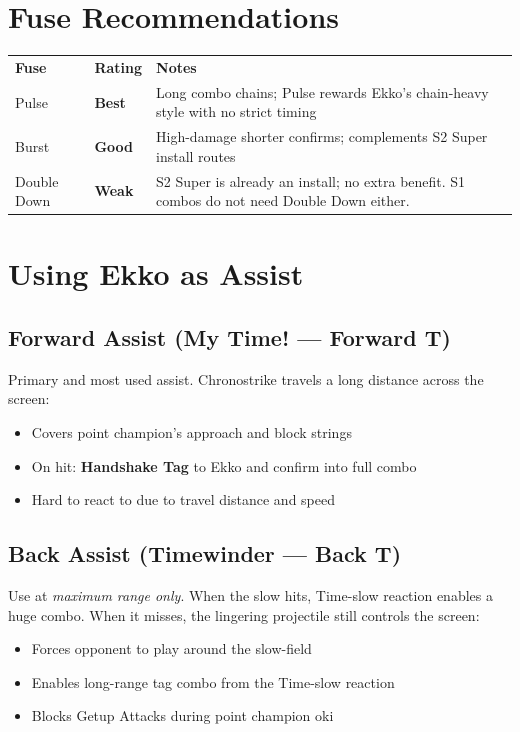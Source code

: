 \documentclass[12pt, a4paper]{report}
\begin{document}
\section{Fuse Recommendations}

\begin{center}
\begin{tabularx}{\linewidth}{C{3cm} C{2cm} L{8.5cm}}
\textcolor{ekkoBlue}{\textbf{Fuse}} & \textcolor{ekkoBlue}{\textbf{Rating}} & \textcolor{ekkoBlue}{\textbf{Notes}} \\
Pulse & \textcolor{ekkoGreen}{\textbf{Best}} & Long combo chains; Pulse rewards Ekko's chain-heavy style with no strict timing \\
Burst & \textcolor{ekkoGold}{\textbf{Good}} & High-damage shorter confirms; complements S2 Super install routes \\
Double Down & \textcolor{ekkoRed}{\textbf{Weak}} & S2 Super is already an install; no extra benefit. S1 combos do not need Double Down either. \\
\end{tabularx}
\end{center}

\section{Using Ekko as Assist}

\subsection{Forward Assist (My Time! --- Forward T)}

Primary and most used assist. Chronostrike travels a long distance across the screen:
\begin{itemize}
  \item Covers point champion's approach and block strings
  \item On hit: \textbf{Handshake Tag} to Ekko and confirm into full combo
  \item Hard to react to due to travel distance and speed
\end{itemize}

\subsection{Back Assist (Timewinder --- Back T)}

Use at \textit{maximum range only}. When the slow hits, Time-slow reaction enables a huge combo. When it misses, the lingering projectile still controls the screen:
\begin{itemize}
  \item Forces opponent to play around the slow-field
  \item Enables long-range tag combo from the Time-slow reaction
  \item Blocks Getup Attacks during point champion oki
\end{itemize}
\end{document}
